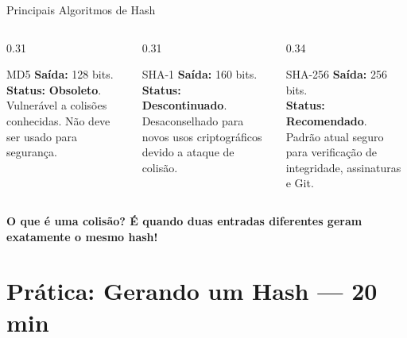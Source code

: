 \documentclass[9pt]{beamer}
\begin{document}
\begin{frame}{Principais Algoritmos de Hash}
  \begin{columns}[T]
    \begin{column}{0.31\textwidth}
      \begin{block}{MD5}
        \small
        \textbf{Saída:} 128 bits.\\
        \textbf{Status:} \color{mRed}\textbf{Obsoleto}.\\
        \vspace{0.1cm}
        \scriptsize Vulnerável a colisões conhecidas. Não deve ser usado para segurança.
      \end{block}
    \end{column}

    \begin{column}{0.31\textwidth}
      \begin{block}{SHA-1}
        \small
        \textbf{Saída:} 160 bits.\\
        \textbf{Status:} \color{orange!80!black}\textbf{Descontinuado}.\\
        \vspace{0.1cm}
        \scriptsize Desaconselhado para novos usos criptográficos devido a ataque de colisão.
      \end{block}
    \end{column}

    \begin{column}{0.34\textwidth}
      \begin{block}{SHA-256}
        \small
        \textbf{Saída:} 256 bits.\\
        \textbf{Status:} \color{mGreen!80!black}\textbf{Recomendado}.\\
        \vspace{0.1cm}
        \scriptsize Padrão atual seguro para verificação de integridade, assinaturas e Git.
      \end{block}
    \end{column}
  \end{columns}

  \vspace{0.4cm}

  \begin{center}
    \small\color{structure.fg}\bfseries O que é uma colisão? É quando duas entradas diferentes geram exatamente o mesmo hash!
  \end{center}
\end{frame}

\section{Prática: Gerando um Hash — 20 min}
\end{document}
